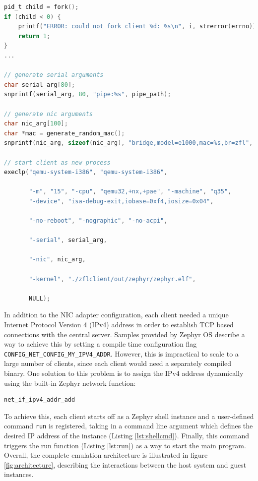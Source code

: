 \documentclass[12pt]{article}
\begin{document}
\begin{lstlisting}[language=C,caption=Client forking process,label={lst:fork}]
pid_t child = fork();
if (child < 0) {
    printf("ERROR: could not fork client %d: %s\n", i, strerror(errno));
    return 1;
}
...

// generate serial arguments
char serial_arg[80];
snprintf(serial_arg, 80, "pipe:%s", pipe_path);

// generate nic arguments
char nic_arg[100];
char *mac = generate_random_mac();
snprintf(nic_arg, sizeof(nic_arg), "bridge,model=e1000,mac=%s,br=zfl", mac);

// start client as new process
execlp("qemu-system-i386", "qemu-system-i386",

       "-m", "15", "-cpu", "qemu32,+nx,+pae", "-machine", "q35",
       "-device", "isa-debug-exit,iobase=0xf4,iosize=0x04",

       "-no-reboot", "-nographic", "-no-acpi",

       "-serial", serial_arg,

       "-nic", nic_arg,

       "-kernel", "./zflclient/out/zephyr/zephyr.elf",

       NULL);
\end{lstlisting}

In addition to the NIC adapter configuration, each client needed a unique Internet Protocol Version
4 (IPv4) address in order to establish TCP based connections with the central server. Samples
provided by Zephyr OS describe a way to achieve this by setting a compile time configuration flag\\
\verb|CONFIG_NET_CONFIG_MY_IPV4_ADDR|. However, this is impractical to scale to a large number of clients, since
each client would need a separately compiled binary. One solution to this problem is to assign the IPv4 address
dynamically using the built-in Zephyr network function\cite{schirrmeister_2020_simulation}:
\begin{verbatim}
net_if_ipv4_addr_add
\end{verbatim}
To achieve this, each client starts off as a Zephyr shell instance and a user-defined command
\verb|run| is registered, taking in a command line argument which defines the desired IP address of the
instance (Listing \ref{lst:shellcmd}). Finally, this command triggers the run function
(Listing \ref{lst:run}) as a way to start the main program. \\

Overall, the complete emulation architecture is illustrated in figure \ref{fig:architecture},
describing the interactions between the host system and guest instances. \\
\end{document}
